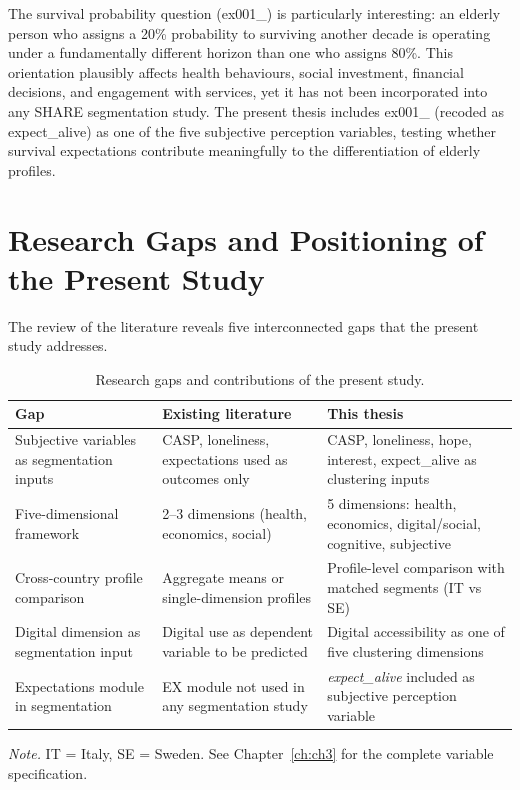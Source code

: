 The survival probability question (ex001\_) is particularly interesting: an elderly person who assigns a 20\% probability to surviving another decade is operating under a fundamentally different horizon than one who assigns 80\%. This orientation plausibly affects health behaviours, social investment, financial decisions, and engagement with services, yet it has not been incorporated into any SHARE segmentation study. The present thesis includes ex001\_ (recoded as expect\_alive) as one of the five subjective perception variables, testing whether survival expectations contribute meaningfully to the differentiation of elderly profiles.

\section{Research Gaps and Positioning of the Present Study}
The review of the literature reveals five interconnected gaps that the present study addresses.

\begin{table}[ht]
  \centering
  \caption{Research gaps and contributions of the present study.}
  \label{tab:ch2-gaps}
  \small
  \begin{tabular}{@{}p{3.5cm}p{5cm}p{5cm}@{}}
    \toprule
    \textbf{Gap} & \textbf{Existing literature} & \textbf{This thesis}\\
    \midrule
    Subjective variables as segmentation inputs & CASP, loneliness, expectations used as outcomes only & CASP, loneliness, hope, interest, expect\_alive as clustering inputs\\
    Five-dimensional framework & 2--3 dimensions (health, economics, social) & 5 dimensions: health, economics, digital/social, cognitive, subjective\\
    Cross-country profile comparison & Aggregate means or single-dimension profiles & Profile-level comparison with matched segments (IT vs SE)\\
    Digital dimension as segmentation input & Digital use as dependent variable to be predicted & Digital accessibility as one of five clustering dimensions\\
    Expectations module in segmentation & EX module not used in any segmentation study & \emph{expect\_alive} included as subjective perception variable\\
    \bottomrule
  \end{tabular}
  \par\smallskip
  \footnotesize \emph{Note.} IT = Italy, SE = Sweden. See Chapter~\ref{ch:ch3} for the complete variable specification.
\end{table}

